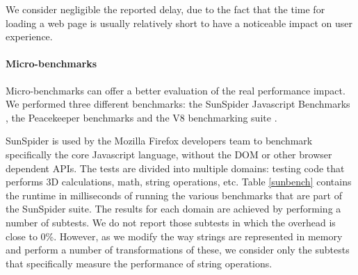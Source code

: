 We consider negligible the reported delay, due to the fact that the time for loading a web page is usually relatively short to have a noticeable impact on user experience.

\paragraph{Micro-benchmarks}
Micro-benchmarks can offer a better evaluation of the real performance impact. We performed three different benchmarks: the SunSpider Javascript Benchmarks \cite{sunspider}, the Peacekeeper benchmarks \cite{peacekeeper} and the V8 benchmarking suite \cite{V8}.

SunSpider is used by the Mozilla Firefox developers team to benchmark specifically the core Javascript language, without the DOM or other browser dependent APIs. The tests are divided into multiple domains: testing code that performs 3D calculations, math, string operations, etc.
Table \ref{sunbench} contains the runtime in milliseconds of running the various benchmarks that are part of the SunSpider suite. 
The results for each domain are achieved by performing a number of subtests.  We do not report those subtests in which the overhead is close to 0\%. However, as we modify the way strings are represented in memory and perform a number of transformations of these, we consider only the subtests that specifically measure the performance of string operations. 

